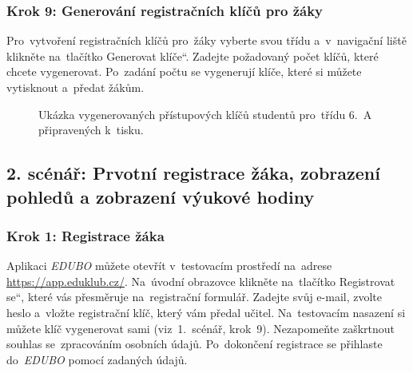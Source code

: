 \documentclass[male,czech,api_bc]{kitheses}
\begin{document}
\subsubsection{Krok 9: Generování registračních klíčů pro žáky}
Pro~vytvoření registračních klíčů pro~žáky vyberte svou třídu a~v~navigační liště klikněte na~tlačítko \quotedblbase Generovat klíče``. Zadejte požadovaný počet klíčů, které chcete vygenerovat. Po~zadání počtu se vygenerují klíče, které si můžete vytisknout a~předat žákům.

\begin{figure}[H]
	\centering
	\caption{Ukázka vygenerovaných přístupových klíčů studentů pro~třídu 6.~A připravených k~tisku.}
	\label{fig:manual-5}
\end{figure}

\subsection{2. scénář: Prvotní registrace žáka, zobrazení pohledů a zobrazení výukové hodiny}

\subsubsection{Krok 1: Registrace žáka}
Aplikaci \textit{EDUBO} můžete otevřít v~testovacím prostředí na~adrese \url{https://app.eduklub.cz/}. Na~úvodní obrazovce klikněte na~tlačítko \quotedblbase Registrovat se``, které vás přesměruje na~registrační formulář. Zadejte svůj e-mail, zvolte heslo a~vložte registrační klíč, který vám předal učitel. Na~testovacím nasazení si můžete klíč vygenerovat sami (viz~1.~scénář, krok~9). Nezapomeňte zaškrtnout souhlas se~zpracováním osobních údajů. Po~dokončení registrace se přihlaste do~\textit{EDUBO} pomocí zadaných údajů.
\end{document}
